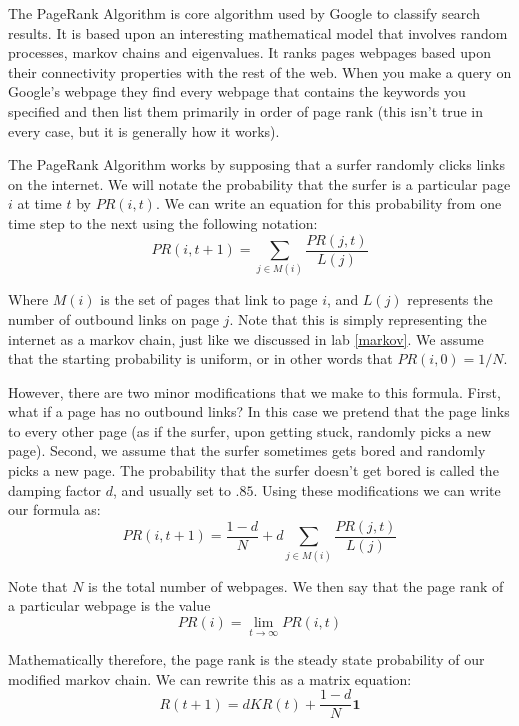 \label{Ch:PageRank}


The PageRank Algorithm is core algorithm used by Google to classify search results. It is based upon an interesting mathematical model that involves random processes, markov chains and eigenvalues. It ranks pages webpages based upon their connectivity properties with the rest of the web. When you make a query on Google's webpage they find every webpage that contains the keywords you specified and then list them primarily in order of page rank (this isn't true in every case, but it is generally how it works).

The PageRank Algorithm works by supposing that a surfer randomly clicks links on the internet. We will notate the probability that the surfer is a particular page $i$ at time $t$ by $PR(i,t)$. We can write an equation for this probability from one time step to the next using the following notation:
\[
PR(i,t+1) = \sum_{j \in M(i)} \frac{PR(j,t)}{L(j)}
\]

Where $M(i)$ is the set of pages that link to page $i$, and $L(j)$ represents the number of outbound links on page $j$. Note that this is simply representing the internet as a markov chain, just like we discussed in lab \ref{markov}. We assume that the starting probability is uniform, or in other words that $PR(i,0) = 1/N$.

However, there are two minor modifications that we make to this formula. First, what if a page has no outbound links? In this case we pretend that the page links to every other page (as if the surfer, upon getting stuck, randomly picks a new page). Second, we assume that the surfer sometimes gets bored and randomly picks a new page. The probability that the surfer doesn't get bored is called the damping factor $d$, and usually set to $.85$. Using these modifications we can write our formula as:
\[
PR(i,t+1) = \frac{1-d}{N} + d\sum_{j \in M(i)} \frac{PR(j,t)}{L(j)}
\]

Note that $N$ is the total number of webpages. We then say that the page rank of a particular webpage is the value
\[
PR(i) = \lim_{t\to \infty} PR(i,t)
\]

Mathematically therefore, the page rank is the steady state probability of our modified markov chain. We can rewrite this as a matrix equation:
\[
R(t+1) = d K R(t) + \frac{1-d}{N} \mathbf{1}
\]


